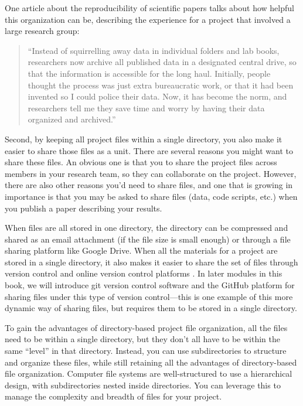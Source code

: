 \documentclass[]{tufte-book}
\begin{document}
One article about the reproducibility of scientific papers talks about how helpful
this organization can be, describing the experience for a project that involved
a large research group:

\begin{quote}
``Instead of squirrelling away data in individual folders and lab books,
researchers now archive all published data in a designated central drive, so
that the information is accessible for the long haul. Initially, people thought
the process was just extra bureaucratic work, or that it had been invented so I
could police their data. Now, it has become the norm, and researchers tell me
they save time and worry by having their data organized and archived.''
\citep{winchester2018give}
\end{quote}

Second, by keeping all project files within a single directory, you also make it
easier to share those files as a unit. There are several reasons you might
want to share these files. An obvious one is that you to share
the project files across members in your research team, so they can collaborate
on the project. However, there are also other reasons you'd need to
share files, and one that is growing in importance is that you may be asked to
share files (data, code scripts, etc.) when you publish a paper describing your
results.

When files are all stored in one directory, the directory can be compressed and
shared as an email attachment (if the file size is small enough) or through a
file sharing platform like Google Drive. When all the materials for a project
are stored in a single directory, it also makes it easier to share the set of
files through version control and online version control platforms
\citep{vuorre2021sharing}. In later modules in this book, we will introduce
git version control software and the GitHub platform for sharing files under
this type of version control---this is one example of this more dynamic way of
sharing files, but requires them to be stored in a single directory.

To gain the advantages of directory-based project file organization, all the
files need to be within a single directory, but they don't all have to be within
the same ``level'' in that directory. Instead, you can use subdirectories to
structure and organize these files, while still retaining all the advantages of
directory-based file organization. Computer file systems are well-structured to
use a hierarchical design, with subdirectories nested inside directories. You
can leverage this to manage the complexity and breadth of files for your
project.
\end{document}
